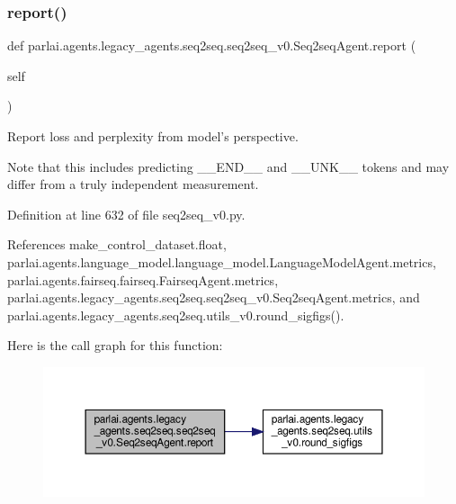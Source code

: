 \subsubsection{\texorpdfstring{report()}{report()}}
{\footnotesize\ttfamily def parlai.\+agents.\+legacy\+\_\+agents.\+seq2seq.\+seq2seq\+\_\+v0.\+Seq2seq\+Agent.\+report (\begin{DoxyParamCaption}\item[{}]{self }\end{DoxyParamCaption})}

\begin{DoxyVerb}Report loss and perplexity from model's perspective.

Note that this includes predicting __END__ and __UNK__ tokens and may
differ from a truly independent measurement.
\end{DoxyVerb}
 

Definition at line 632 of file seq2seq\+\_\+v0.\+py.



References make\+\_\+control\+\_\+dataset.\+float, parlai.\+agents.\+language\+\_\+model.\+language\+\_\+model.\+Language\+Model\+Agent.\+metrics, parlai.\+agents.\+fairseq.\+fairseq.\+Fairseq\+Agent.\+metrics, parlai.\+agents.\+legacy\+\_\+agents.\+seq2seq.\+seq2seq\+\_\+v0.\+Seq2seq\+Agent.\+metrics, and parlai.\+agents.\+legacy\+\_\+agents.\+seq2seq.\+utils\+\_\+v0.\+round\+\_\+sigfigs().

Here is the call graph for this function\+:
\nopagebreak
\begin{figure}[H]
\begin{center}
\leavevmode
\includegraphics[width=350pt]{classparlai_1_1agents_1_1legacy__agents_1_1seq2seq_1_1seq2seq__v0_1_1Seq2seqAgent_a83a444ecb418dfb4381147f23653dd7b_cgraph}
\end{center}
\end{figure}
\mbox{\label{classparlai_1_1agents_1_1legacy__agents_1_1seq2seq_1_1seq2seq__v0_1_1Seq2seqAgent_a56d246fd8b6bcf41726181c17cdc2762}} 
